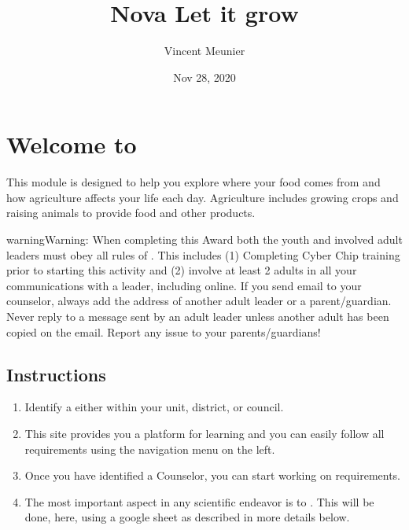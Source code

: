 \documentclass[letterpaper,10pt,english,openany,oneside]{sphinxmanual}
\title{Nova \sphinxhyphen{} Let it grow}
\date{Nov 28, 2020}
\author{Vincent Meunier}
\begin{document}
\pagestyle{empty}
\sphinxmaketitle
\pagestyle{plain}
\sphinxtableofcontents
\pagestyle{normal}
\label{\detokenize{index::doc}}



\chapter{Welcome to }
\label{\detokenize{introduction:welcome-to-let-it-grow}}\label{\detokenize{introduction:introduction}}\label{\detokenize{introduction::doc}}
This module is designed to help you explore where your food comes from and how agriculture affects your life each day. Agriculture includes growing crops and raising animals to provide food and other products.

\begin{sphinxadmonition}{warning}{Warning:}
When completing this Award both the youth and involved adult leaders must obey all rules of . This includes (1) Completing Cyber Chip training prior to starting this activity and (2)  involve at least 2 adults in all your communications with a leader, including online. If you send email to your counselor, always add the address of another adult leader or a parent/guardian. Never reply to a message sent by an adult leader unless another adult has been copied on the email. Report any issue to your parents/guardians!
\end{sphinxadmonition}


\section{Instructions}
\label{\detokenize{introduction:instructions}}\begin{enumerate}
%
\item {} 
Identify a  either within your unit, district, or council.

\item {} 
This site provides you a platform for learning and you can easily follow all requirements using the navigation menu on the left.

\item {} 
Once you have identified a Counselor, you can start working on requirements.

\item {} 
The most important aspect in any scientific endeavor is to . This will be done, here, using a google sheet as described in more details below.

\end{enumerate}
\end{document}
